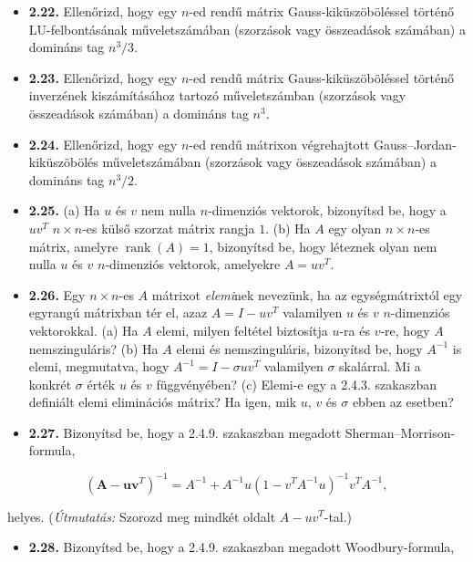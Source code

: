 \documentclass[
  magyar,
  11pt]{article}
\providecommand{\tightlist}{%
  \setlength{\itemsep}{0pt}\setlength{\parskip}{0pt}}
\providecommand{\boldsymbol}[1]{\mathbf{#1}}
\begin{document}
\begin{itemize}
\tightlist
\item
  \textbf{2.22.} Ellenőrizd, hogy egy \(n\)-ed rendű mátrix
  Gauss-kiküszöböléssel történő LU-felbontásának műveletszámában
  (szorzások vagy összeadások számában) a domináns tag \(n^3/3\).
\item
  \textbf{2.23.} Ellenőrizd, hogy egy \(n\)-ed rendű mátrix
  Gauss-kiküszöböléssel történő inverzének kiszámításához tartozó
  műveletszámban (szorzások vagy összeadások számában) a domináns tag
  \(n^3\).
\item
  \textbf{2.24.} Ellenőrizd, hogy egy \(n\)-ed rendű mátrixon
  végrehajtott Gauss--Jordan-kiküszöbölés műveletszámában (szorzások
  vagy összeadások számában) a domináns tag \(n^3/2\).
\item
  \textbf{2.25.} (a) Ha \(u\) és \(v\) nem nulla \(n\)-dimenziós
  vektorok, bizonyítsd be, hogy a \(uv^T\) \(n \times n\)-es külső
  szorzat mátrix rangja \(1\). (b) Ha \(A\) egy olyan \(n \times n\)-es
  mátrix, amelyre \(\operatorname{rank}(A) = 1\), bizonyítsd be, hogy
  léteznek olyan nem nulla \(u\) és \(v\) \(n\)-dimenziós vektorok,
  amelyekre \(A = uv^T\).
\item
  \textbf{2.26.} Egy \(n \times n\)-es \(A\) mátrixot \emph{elemi}nek
  nevezünk, ha az egységmátrixtól egy egyrangú mátrixban tér el, azaz
  \(A = I - uv^T\) valamilyen \(u\) és \(v\) \(n\)-dimenziós
  vektorokkal. (a) Ha \(A\) elemi, milyen feltétel biztosítja \(u\)-ra
  és \(v\)-re, hogy \(A\) nemszinguláris? (b) Ha \(A\) elemi és
  nemszinguláris, bizonyítsd be, hogy \(A^{-1}\) is elemi, megmutatva,
  hogy \(A^{-1} = I - \sigma u v^T\) valamilyen \(\sigma\) skalárral. Mi
  a konkrét \(\sigma\) érték \(u\) és \(v\) függvényében? (c) Elemi-e
  egy a 2.4.3. szakaszban definiált elemi eliminációs mátrix? Ha igen,
  mik \(u\), \(v\) és \(\sigma\) ebben az esetben?
\item
  \textbf{2.27.} Bizonyítsd be, hogy a 2.4.9. szakaszban megadott
  Sherman--Morrison-formula,
\end{itemize}

\[(\boldsymbol{A} - \boldsymbol{u}\boldsymbol{v}^T)^{-1} = A^{-1} + A^{-1}u(1 - v^T A^{-1}u)^{-1}v^T A^{-1},\]

helyes. (\emph{Útmutatás:} Szorozd meg mindkét oldalt \(A - uv^T\)-tal.)

\begin{itemize}
\tightlist
\item
  \textbf{2.28.} Bizonyítsd be, hogy a 2.4.9. szakaszban megadott
  Woodbury-formula,
\end{itemize}
\end{document}
